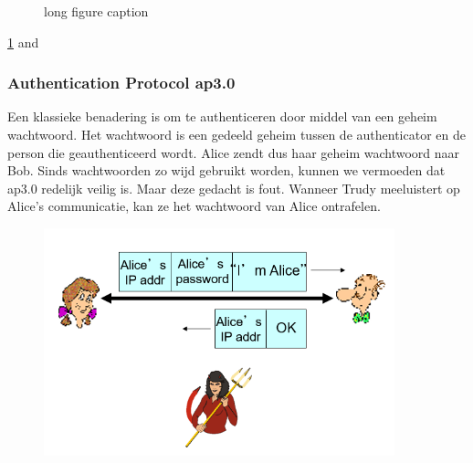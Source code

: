 \begin{figure}[ht]
\centering

\caption[short for lof]{long figure caption}
\label{fig:fig1}
\end{figure}
\ref{fig:fig1} and 

\subsubsection{Authentication Protocol ap3.0}

Een klassieke benadering is om te authenticeren door middel van een geheim wachtwoord. Het wachtwoord is een gedeeld geheim tussen de authenticator en de person die geauthenticeerd wordt.
Alice zendt dus haar geheim wachtwoord naar Bob. Sinds wachtwoorden zo wijd gebruikt worden, kunnen we vermoeden dat ap3.0 redelijk veilig is.
Maar deze gedacht is fout. Wanneer Trudy meeluistert op Alice’s communicatie, kan ze het wachtwoord van Alice ontrafelen.
\begin{figure}[h]
    \centering
    \includegraphics[width=4in]{./img/imghfdst8/hfdst8puntje16.png}
    \caption{ }      
    \label{fig: }
\end{figure}

